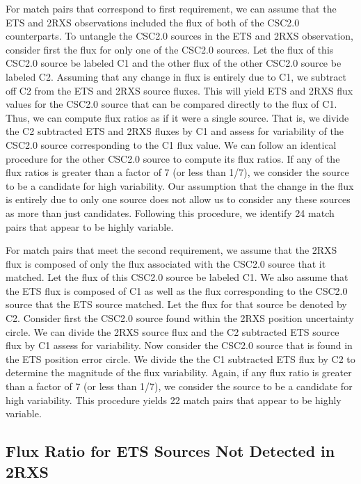 For match pairs that correspond to first requirement, we can assume that the ETS and 2RXS observations included the flux of both of the CSC2.0 counterparts. 
To untangle the CSC2.0 sources in the ETS and 2RXS observation, consider first the flux for only one of the CSC2.0 sources. 
Let the flux of this CSC2.0 source be labeled C1 and the other flux of the other CSC2.0 source be labeled C2.
Assuming that any change in flux is entirely due to C1, we subtract off C2 from the ETS and 2RXS source fluxes.
This will yield ETS and 2RXS flux values for the CSC2.0 source that can be compared directly to the flux of C1.
Thus, we can compute flux ratios as if it were a single source.
That is, we divide the C2 subtracted ETS and 2RXS fluxes by C1 and assess for variability of the CSC2.0 source corresponding to the C1 flux value.
We can follow an identical procedure for the other CSC2.0 source to compute its flux ratios.
If any of the flux ratios is greater than a factor of 7 (or less than 1/7), we consider the source to be a candidate for high variability.
Our assumption that the change in the flux is entirely due to only one source does not allow us to consider any these sources as more than just candidates.
Following this procedure, we identify 24 match pairs that appear to be highly variable.

For match pairs that meet the second requirement, we assume that the 2RXS flux is composed of only the flux associated with the CSC2.0 source that it matched. 
Let the flux of this CSC2.0 source be labeled C1.
We also assume that the ETS flux is composed of C1 as well as the flux corresponding to the CSC2.0 source that the ETS source matched.
Let the flux for that source be denoted by C2.
Consider first the CSC2.0 source found within the 2RXS position uncertainty circle.
We can divide the 2RXS source flux and the C2 subtracted ETS source flux by C1 assess for variability.
Now consider the CSC2.0 source that is found in the ETS position error circle.
We divide the the C1 subtracted ETS flux by C2 to determine the magnitude of the flux variability.
Again, if any flux ratio is greater than a factor of 7 (or less than 1/7), we consider the source to be a candidate for high variability.
This procedure yields 22 match pairs that appear to be highly variable.

\subsection{Flux Ratio for ETS Sources Not Detected in 2RXS}

